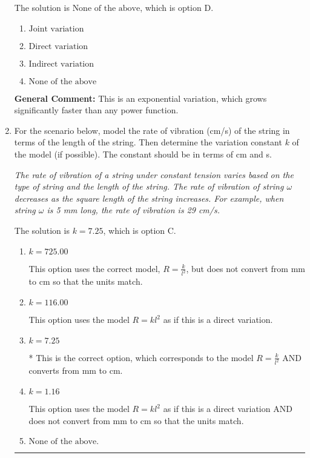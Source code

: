 \documentclass{extbook}[14pt]
\newcommand{\litem}[1]{\item #1

\rule{\textwidth}{0.4pt}}
\begin{document}
\begin{enumerate}
{The solution is \( \text{None of the above} \), which is option D.\begin{enumerate}[label=\Alph*.]
\item \( \text{Joint variation} \)


\item \( \text{Direct variation} \)


\item \( \text{Indirect variation} \)


\item \( \text{None of the above} \)


\end{enumerate}

\textbf{General Comment:} This is an exponential variation, which grows significantly faster than any power function.
}
\litem{
For the scenario below, model the rate of vibration (cm/s) of the string in terms of the length of the string. Then determine the variation constant $k$ of the model (if possible). The constant should be in terms of cm and s.

\begin{center}
    \textit{ The rate of vibration of a string under constant tension varies based on the type of string and the length of the string. The rate of vibration of string $\omega$ decreases as the square length of the string increases. For example, when string $\omega$ is 5 mm long, the rate of vibration is 29 cm/s. }
\end{center}


The solution is \( k = 7.25 \), which is option C.\begin{enumerate}[label=\Alph*.]
\item \( k = 725.00 \)

This option uses the correct model, $R = \frac{k}{l^{2}}$, but does not convert from mm to cm so that the units match.
\item \( k = 116.00 \)

This option uses the model $R = kl^{2}$ as if this is a direct variation.
\item \( k = 7.25 \)

* This is the correct option, which corresponds to the model $R = \frac{k}{l^{2}}$ AND converts from mm to cm.
\item \( k = 1.16 \)

This option uses the model $R = kl^{2}$ as if this is a direct variation AND does not convert from mm to cm so that the units match.
\item \( \text{None of the above.} \)


\end{enumerate}}
\end{enumerate}
\end{document}
